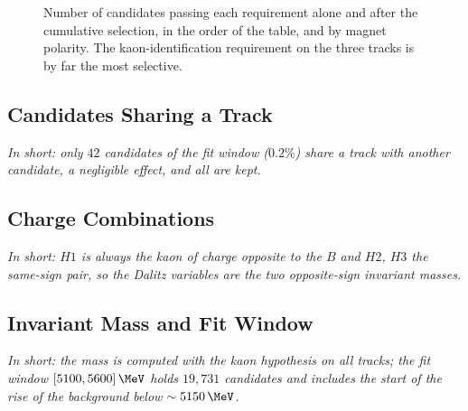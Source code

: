 \begin{figure}[!t]
\makeatletter{}\makeatother
\centering
{}
\caption{Number of candidates passing each requirement alone and after the cumulative selection, in the order of the table, and by magnet polarity. The kaon-identification requirement on the three tracks is by far the most selective.}
\label{tab:cutflow}
\end{figure}

\subsection{Candidates Sharing a Track}
\label{app:shared_track}
\emph{In short: only $42$ candidates of the fit window ($0.2\%$) share a track with another candidate, a negligible effect, and all are kept.}

\subsection{Charge Combinations}
\emph{In short: $H1$ is always the kaon of charge opposite to the $B$ and $H2$, $H3$ the same-sign pair, so the Dalitz variables are the two opposite-sign invariant masses.}

\subsection{Invariant Mass and Fit Window}
\emph{In short: the mass is computed with the kaon hypothesis on all tracks; the fit window $[5100,5600]\,\MeV$ holds $19{,}731$ candidates and includes the start of the rise of the background below $\sim5150\,\MeV$.}

